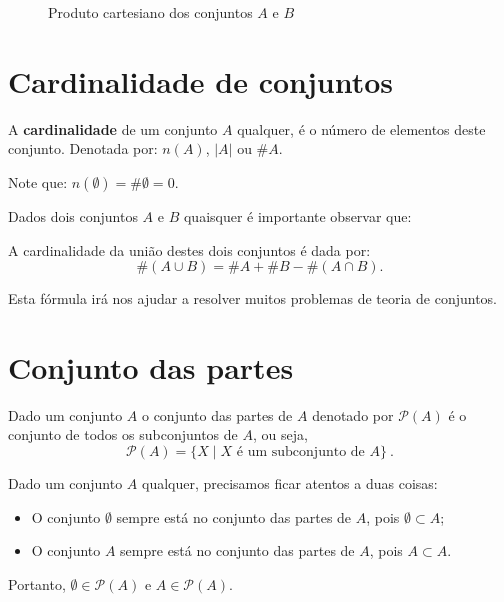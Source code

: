 \begin{exem}
  \begin{figure}[H]
 \centering
    \caption{Produto cartesiano dos conjuntos $A$ e $B$}
  \end{figure}

 \end{exem}

\section{Cardinalidade de conjuntos}

 A \textbf{cardinalidade} de um conjunto $A$ qualquer, é o número de elementos deste conjunto. Denotada por: $n(A)$, $|A|$ ou $\# A$.

 Note que: $n(\emptyset)= \# \emptyset= 0$.

 Dados dois conjuntos $A$ e $B$ quaisquer é importante observar que:
 \vskip0.3cm
 \colorbox{azul}{
 \begin{minipage}{0.9\linewidth}
 \begin{center}
 A cardinalidade da união destes dois conjuntos é dada por:
  \[\#(A \cup B)= \# A + \# B - \#(A \cap B) .\]
 \end{center}
 \end{minipage}}
 \vskip0.3cm

 Esta fórmula irá nos ajudar a resolver muitos problemas de teoria de conjuntos.
 
 \section{Conjunto das partes}
 
 Dado um conjunto $A$ o conjunto das partes de $A$ denotado por $\mathcal{P}(A)$ é o conjunto de todos os subconjuntos de $A$, ou seja,
 \[\mathcal{P}(A)= \{X \mid X \text{ é um subconjunto de } A\} \ .\]
 
 Dado um conjunto $A$ qualquer, precisamos ficar atentos a duas coisas:
 \begin{itemize}
 \item O conjunto $\emptyset$ sempre está no conjunto das partes de $A$, pois $\emptyset \subset A$;
 \item O conjunto $A$ sempre está no conjunto das partes de $A$, pois $A \subset A$.
 \end{itemize}
 Portanto, $\emptyset \in \mathcal{P}(A)$ e $A \in \mathcal{P}(A)$.
 
